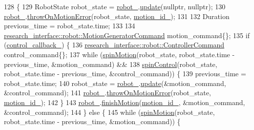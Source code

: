 \begin{DoxyCode}
128                                     \{
129   RobotState robot\_state = \hyperlink{classfranka_1_1ControlLoop_aa618899fdcd85da8659fb3b1bd8c65b3}{robot\_}.\hyperlink{classfranka_1_1RobotControl_a5b581e84547a76ad1600158345cfd40d}{update}(\textcolor{keyword}{nullptr}, \textcolor{keyword}{nullptr});
130   \hyperlink{classfranka_1_1ControlLoop_aa618899fdcd85da8659fb3b1bd8c65b3}{robot\_}.\hyperlink{classfranka_1_1RobotControl_a796e9fb049ffc36ea44bec85f24e2fe4}{throwOnMotionError}(robot\_state, \hyperlink{classfranka_1_1ControlLoop_a4dd139afcabc3a50bb9eb35ca44845fa}{motion\_id\_});
131 
132   Duration previous\_time = robot\_state.time;
133 
134   \hyperlink{structresearch__interface_1_1robot_1_1MotionGeneratorCommand}{research\_interface::robot::MotionGeneratorCommand} 
      motion\_command\{\};
135   \textcolor{keywordflow}{if} (\hyperlink{classfranka_1_1ControlLoop_a71249c690ee56b2c099bbb4f29e92c95}{control\_callback\_}) \{
136     \hyperlink{structresearch__interface_1_1robot_1_1ControllerCommand}{research\_interface::robot::ControllerCommand} 
      control\_command\{\};
137     \textcolor{keywordflow}{while} (\hyperlink{classfranka_1_1ControlLoop_abec82e0ac5015ccc5fb078851ecae381}{spinMotion}(robot\_state, robot\_state.time - previous\_time, &motion\_command) &&
138            \hyperlink{classfranka_1_1ControlLoop_a480c19a57bf2a7df4ab9c6f68667b865}{spinControl}(robot\_state, robot\_state.time - previous\_time, &control\_command)) \{
139       previous\_time = robot\_state.time;
140       robot\_state = \hyperlink{classfranka_1_1ControlLoop_aa618899fdcd85da8659fb3b1bd8c65b3}{robot\_}.\hyperlink{classfranka_1_1RobotControl_a5b581e84547a76ad1600158345cfd40d}{update}(&motion\_command, &control\_command);
141       \hyperlink{classfranka_1_1ControlLoop_aa618899fdcd85da8659fb3b1bd8c65b3}{robot\_}.\hyperlink{classfranka_1_1RobotControl_a796e9fb049ffc36ea44bec85f24e2fe4}{throwOnMotionError}(robot\_state, \hyperlink{classfranka_1_1ControlLoop_a4dd139afcabc3a50bb9eb35ca44845fa}{motion\_id\_});
142     \}
143     \hyperlink{classfranka_1_1ControlLoop_aa618899fdcd85da8659fb3b1bd8c65b3}{robot\_}.\hyperlink{classfranka_1_1RobotControl_aae1629178b5eeb5d8e4d41d2f746f2fc}{finishMotion}(\hyperlink{classfranka_1_1ControlLoop_a4dd139afcabc3a50bb9eb35ca44845fa}{motion\_id\_}, &motion\_command, &control\_command);
144   \} \textcolor{keywordflow}{else} \{
145     \textcolor{keywordflow}{while} (\hyperlink{classfranka_1_1ControlLoop_abec82e0ac5015ccc5fb078851ecae381}{spinMotion}(robot\_state, robot\_state.time - previous\_time, &motion\_command)) \{

\end{DoxyCode}

